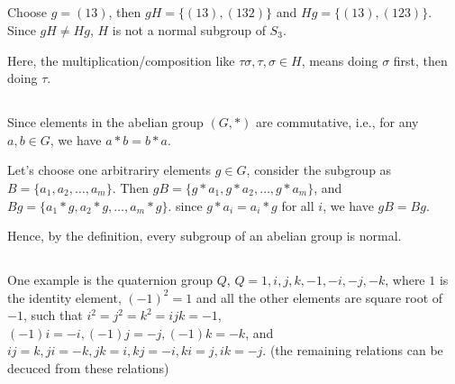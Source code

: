 \documentclass[12pt]{article}
\begin{document}
\subsection{} %
Choose $g=(13)$, then $gH=\{(13),(132)\}$ and $Hg=\{(13),(123)\}$. Since $gH\ne Hg$, $H$ is not a normal subgroup of $S_3$.

Here, the multiplication/composition like $\tau\sigma,\tau,\sigma\in H$, means doing $\sigma$ first, then doing $\tau$.
\subsection{} %
Since elements in the abelian group $(G,*)$ are commutative, i.e., for any $a,b\in G$, we have $a*b=b*a$.

Let's choose one arbitrariry elements $g\in G$, consider the subgroup as $B=\{a_1,a_2,\dots,a_m\}$. Then $gB=\{g*a_1,g*a_2,\dots,g*a_m\}$, and $Bg=\{a_1*g,a_2*g,\dots,a_m*g\}$. since $g*a_i=a_i*g$ for all $i$, we have $gB=Bg$.

Hence, by the definition, every subgroup of an abelian group is normal.
\subsection{} %
One example is the quaternion group $Q$, $Q={1,i,j,k,-1,-i,-j,-k}$, where $1$ is the identity element, $(-1)^2=1$ and all the other elements are square root of $-1$, such that $i^2=j^2=k^2=ijk=-1$, $(-1)i=-i,(-1)j=-j, (-1)k=-k$, and $ij=k,ji=-k,jk=i,kj=-i,ki=j,ik=-j$. (the remaining relations can be decuced from these relations)
\end{document}
